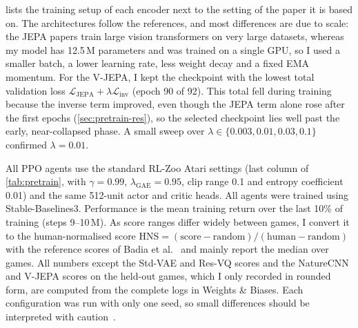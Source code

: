 \documentclass[runningheads]{llncs}
\begin{document}
 lists the training setup of each encoder next to the setting of the paper
it is based on. The architectures follow the references, and most differences are due to scale: the JEPA
papers train large vision transformers on very large datasets, whereas my model has
12.5\,M parameters and was trained on a single GPU, so I used a smaller batch, a lower learning
rate, less weight decay and a fixed EMA momentum. For the V-JEPA, I kept the checkpoint with
the lowest total validation loss $\mathcal{L}_{\text{JEPA}}+\lambda\mathcal{L}_{\text{inv}}$
(epoch 90 of 92). This total fell during training because the inverse term improved, even though
the JEPA term alone rose after the first epochs (\cref{sec:pretrain-res}), so the selected
checkpoint lies well past the early, near-collapsed phase. A small sweep over
$\lambda\in\{0.003,0.01,0.03,0.1\}$ confirmed $\lambda=0.01$.

All PPO agents use the standard RL-Zoo Atari settings (last column of \cref{tab:pretrain},
with $\gamma=0.99$, $\lambda_{\text{GAE}}=0.95$, clip range 0.1 and entropy coefficient 0.01)
and the same 512-unit actor and critic heads. All agents were trained using
Stable-Baselines3. Performance is the mean training return over the last 10\% of training (steps 9--10\,M). As
score ranges differ widely between games, I convert it to the human-normalised score
HNS$=(\text{score}-\text{random})/(\text{human}-\text{random})$ with the reference scores of
Badia et al.~\cite{badia2020agent57} and mainly report the median over games. All numbers
except the Std-VAE and Res-VQ scores and the NatureCNN and V-JEPA scores on the held-out games,
which I only recorded in rounded form, are computed from the complete logs in Weights \& Biases. Each configuration was run with only one
seed, so small differences should be interpreted with caution~\cite{agarwal2021precipice}.
\end{document}
